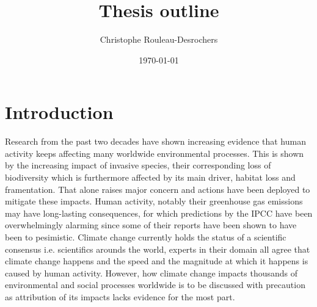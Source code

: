 \documentclass{article}
\title{Thesis outline}
\date{\today}
\author{Christophe Rouleau-Desrochers}
\begin{document}

\maketitle


\section{Introduction}
Research from the past two decades have shown increasing evidence that human activity keeps affecting many worldwide environmental processes. This is shown by the increasing impact of invasive species, their corresponding loss of biodiversity which is furthermore affected by its main driver, habitat loss and framentation. That alone raises major concern and actions have been deployed to mitigate these impacts. Human activity, notably their greenhouse gas emissions may have long-lasting consequences, for which predictions by the IPCC have been overwhelmingly alarming since some of their reports have been shown to have been to pesimistic. Climate change currently holds the status of a scientific consensus i.e. scientifics arounds the world, experts in their domain all agree that climate change happens and the speed and the magnitude at which it happens is caused by human activity. However, how climate change impacts thousands of environmental and social processes worldwide is to be discussed with precaution as attribution of its impacts lacks evidence for the most part. 
\end{document}
